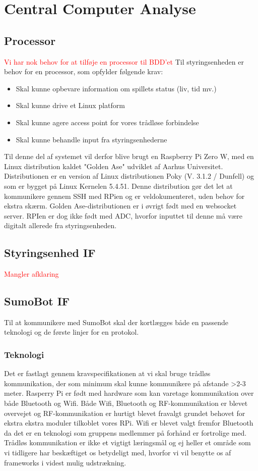 \section{Central Computer Analyse}

\subsection{Processor}
\textcolor{red}{Vi har nok behov for at tilføje en processor til BDD'et}
Til styringsenheden er behov for en processor, som opfylder følgende krav: 
\begin{itemize}
\item Skal kunne opbevare information om spillets status (liv, tid mv.) 
\item Skal kunne drive et Linux platform
\item Skal kunne agere access point for vores trådløse forbindelse 
\item Skal kunne behandle input fra styringsenhederne
\end{itemize}

Til denne del af systemet vil derfor blive brugt en Raspberry Pi Zero W, med en Linux distribution kaldet "Golden Ase" udviklet af Aarhus Universitet. Distributionen er en version af Linux distributionen Poky (V. 3.1.2 / Dunfell) og som er bygget på Linux Kernelen 5.4.51. Denne distribution gør det let at kommunikere gennem SSH med RPien og er veldokumenteret, uden behov for ekstra skærm. Golden Ase-distributionen er i øvrigt født med en websocket server. 
RPIen er dog ikke født med ADC, hvorfor inputtet til denne må være digitalt allerede fra styringsenheden. 

\subsection{Styringsenhed IF}
\textcolor{red}{Mangler afklaring}

\subsection{SumoBot IF}
Til at kommunikere med SumoBot skal der kortlægges både en passende teknologi og de første linjer for en protokol. 

\subsubsection{Teknologi}
Det er fastlagt gennem kravspecifikationen at vi skal bruge trådløs kommunikation, der som minimum skal kunne kommunikere på afstande >2-3 meter. Rasperry Pi er født med hardware som kan varetage kommunikation over både Bluetooth og Wifi. 
Både Wifi, Bluetooth og RF-kommunikation er blevet overvejet og RF-kommunikation er hurtigt blevet fravalgt grundet behovet for ekstra ekstra moduler tilkoblet vores RPi. Wifi er blevet valgt fremfor Bluetooth da det er en teknologi som gruppens medlemmer på forhånd er fortrolige med. Trådløs kommunikation er ikke et vigtigt læringsmål og ej heller et område som vi tidligere har beskæftiget os betydeligt med, hvorfor vi vil benytte os af frameworks i videst mulig udstrækning. 

